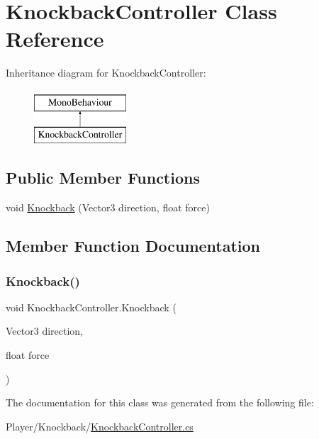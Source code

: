 \hypertarget{class_knockback_controller}{}\section{Knockback\+Controller Class Reference}
\label{class_knockback_controller}
Inheritance diagram for Knockback\+Controller\+:\begin{figure}[H]
\begin{center}
\leavevmode
\includegraphics[height=2.000000cm]{class_knockback_controller}
\end{center}
\end{figure}
\subsection*{Public Member Functions}
\begin{DoxyCompactItemize}
\item 
void \mbox{\hyperlink{class_knockback_controller_a386977286b476eeecd95ab5b35db6671}{Knockback}} (Vector3 direction, float force)
\end{DoxyCompactItemize}


\subsection{Member Function Documentation}
\mbox{\label{class_knockback_controller_a386977286b476eeecd95ab5b35db6671}} 
\subsubsection{\texorpdfstring{Knockback()}{Knockback()}}
{\footnotesize\ttfamily void Knockback\+Controller.\+Knockback (\begin{DoxyParamCaption}\item[{Vector3}]{direction,  }\item[{float}]{force }\end{DoxyParamCaption})}



The documentation for this class was generated from the following file\+:\begin{DoxyCompactItemize}
\item 
Player/\+Knockback/\mbox{\hyperlink{_knockback_controller_8cs}{Knockback\+Controller.\+cs}}\end{DoxyCompactItemize}
